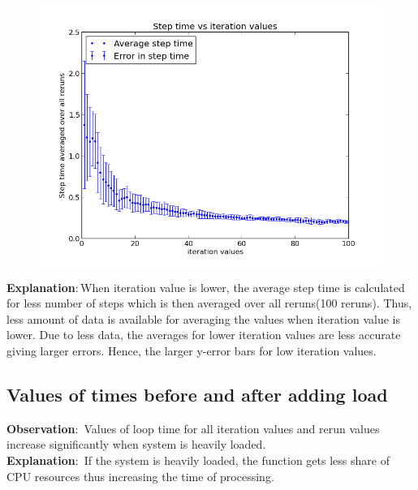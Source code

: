 \documentclass[a4paper,11pt]{article}
\begin{document}
{{\begin{figure}[h]
    \centering
    \includegraphics[scale = 0.5]{images/plot5}
\end{figure}



\indent \textbf{Explanation}$:$When iteration value is lower, the average step time is calculated for less number of steps
 which is then averaged over all reruns(100 reruns). Thus, less amount of data is available for averaging the
 values when iteration value is lower. Due to less data, the averages for lower iteration values are less accurate
 giving larger errors. Hence, the larger y-error bars for low iteration values.
}

\subsection{Values of times before and after adding load}
{
\indent \indent \textbf{Observation}$:$ Values of loop time for all iteration values and rerun values increase significantly when system is heavily loaded.\\

\indent \textbf{Explanation}$:$ If the system is heavily loaded, the function gets less share of CPU resources thus increasing the time of processing.\\

}}
\end{document}
